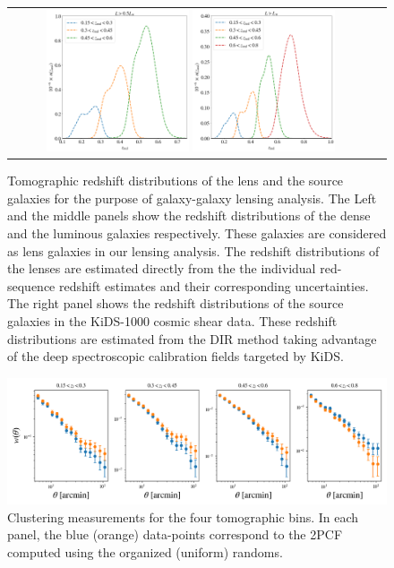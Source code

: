 \documentclass[fleqn,usenatbib,useAMS]{mnras}
\begin{document}
\begin{figure}
 \begin{tabular}{cc}
\includegraphics[width=0.4\textwidth]{figures_tmp/nz_dense.png}
\includegraphics[width=0.4\textwidth]{figures_tmp/nz_lum.png}
\end{tabular}
\caption{\label{fig:nz}  Tomographic redshift distributions of the lens and the source galaxies for the purpose of galaxy-galaxy lensing analysis. The Left and the middle panels show the redshift distributions of the dense and the luminous galaxies respectively. These galaxies are considered as lens galaxies in our lensing analysis. The redshift distributions of the lenses are estimated directly from the the individual red-sequence redshift estimates and their corresponding uncertainties. The right panel shows the redshift distributions of the source galaxies in the KiDS-1000 cosmic shear data. These redshift distributions are estimated from the DIR method taking advantage of the deep spectroscopic calibration fields targeted by KiDS.} 
\end{figure}




\begin{figure}
\includegraphics[width=\textwidth]{figures_tmp/xi.png}
\caption{\label{fig:xi} Clustering measurements for the four tomographic bins. In each panel, the blue (orange) data-points correspond to the 2PCF computed using the organized (uniform) randoms.} 
\end{figure}
\end{document}
